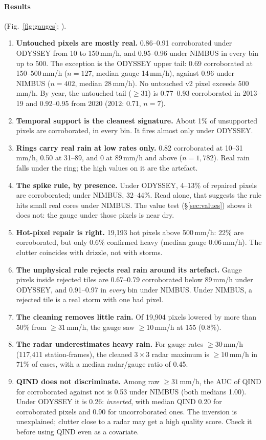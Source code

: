 \documentclass[11pt,a4paper]{article}
\theoremstyle{definition}
\theoremstyle{remark}
\newcommand{\1}{\mathbf{1}}
\newcommand{\code}[1]{\texttt{\detokenize{#1}}}
\begin{document}
\paragraph{Results} (Fig.~\ref{fig:gauges}; \code{validation/values_20261003/corroboration.csv}).
\begin{enumerate}
\item \textbf{Untouched pixels are mostly real.} 0.86--0.91 corroborated under ODYSSEY from 10
  to 150\,mm/h, and 0.95--0.96 under NIMBUS in every bin up to 500. The exception is the
  ODYSSEY upper tail: 0.69 corroborated at 150--500\,mm/h ($n=127$, median gauge 14\,mm/h),
  against 0.96 under NIMBUS ($n=402$, median 28\,mm/h). No untouched v2 pixel exceeds
  500\,mm/h. By year, the untouched tail ($\ge31$) is 0.77--0.93 corroborated in 2013--19
  and 0.92--0.95 from 2020 (2012: 0.71, $n=7$).
\item \textbf{Temporal support is the cleanest signature.} About 1\% of unsupported pixels are
  corroborated, in every bin. It fires almost only under ODYSSEY.
\item \textbf{Rings carry real rain at low rates only.} 0.82 corroborated at 10--31\,mm/h, 0.50
  at 31--89, and 0 at 89\,mm/h and above ($n=1{,}782$). Real rain falls under the ring; the
  high values on it are the artefact.
\item \textbf{The spike rule, by presence.} Under ODYSSEY, 4--13\% of repaired pixels are
  corroborated; under NIMBUS, 32--44\%. Read alone, that suggests the rule hits small real
  cores under NIMBUS. The value test (\S\ref{sec:values}) shows it does not: the gauge under
  those pixels is near dry.
\item \textbf{Hot-pixel repair is right.} 19,193 hot pixels above 500\,mm/h: 22\% are
  corroborated, but only 0.6\% confirmed heavy (median gauge 0.06\,mm/h). The clutter
  coincides with drizzle, not with storms.
\item \textbf{The unphysical rule rejects real rain around its artefact.} Gauge pixels inside
  rejected tiles are 0.67--0.79 corroborated below 89\,mm/h under ODYSSEY, and 0.91--0.97 in
  \emph{every} bin under NIMBUS. Under NIMBUS, a rejected tile is a real storm with one bad
  pixel.
\item \textbf{The cleaning removes little rain.} Of 19,904 pixels lowered by more than 50\% from
  $\ge31$\,mm/h, the gauge saw $\ge10$\,mm/h at 155 (0.8\%).
\item \textbf{The radar underestimates heavy rain.} For gauge rates $\ge30$\,mm/h (117,411
  station-frames), the cleaned $3\times3$ radar maximum is $\ge10$\,mm/h in 71\% of cases,
  with a median radar/gauge ratio of 0.45.
\item \textbf{QIND does not discriminate.} Among raw $\ge31$\,mm/h, the AUC of QIND for
  corroborated against not is 0.53 under NIMBUS (both medians 1.00). Under ODYSSEY it is
  0.26: \emph{inverted}, with median QIND 0.20 for corroborated pixels and 0.90 for
  uncorroborated ones. The inversion is unexplained; clutter close to a radar may get a high
  quality score. Check it before using QIND even as a covariate.
\end{enumerate}
\end{document}
